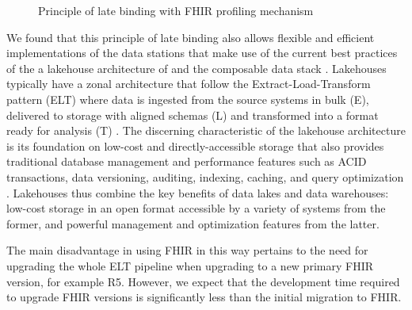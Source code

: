 \documentclass[
  authoryear]{elsarticle}
\begin{document}
\begin{figure}


\caption{\label{fig-late-binding}Principle of late binding with FHIR
profiling mechanism}

\end{figure}%

We found that this principle of late binding also allows flexible and
efficient implementations of the data stations that make use of the
current best practices of the a lakehouse architecture of
\citep{hai2023data, harby2022data, harby2024data} and the composable
data stack \citep{pedreira2023composable}. Lakehouses typically have a
zonal architecture that follow the Extract-Load-Transform pattern (ELT)
where data is ingested from the source systems in bulk (E), delivered to
storage with aligned schemas (L) and transformed into a format ready for
analysis (T) \citep{hai2023data}. The discerning characteristic of the
lakehouse architecture is its foundation on low-cost and
directly-accessible storage that also provides traditional database
management and performance features such as ACID transactions, data
versioning, auditing, indexing, caching, and query optimization
\citep{armbrust2021lakehouse}. Lakehouses thus combine the key benefits
of data lakes and data warehouses: low-cost storage in an open format
accessible by a variety of systems from the former, and powerful
management and optimization features from the latter.

The main disadvantage in using FHIR in this way pertains to the need for
upgrading the whole ELT pipeline when upgrading to a new primary FHIR
version, for example R5. However, we expect that the development time
required to upgrade FHIR versions is significantly less than the initial
migration to FHIR.
\end{document}
